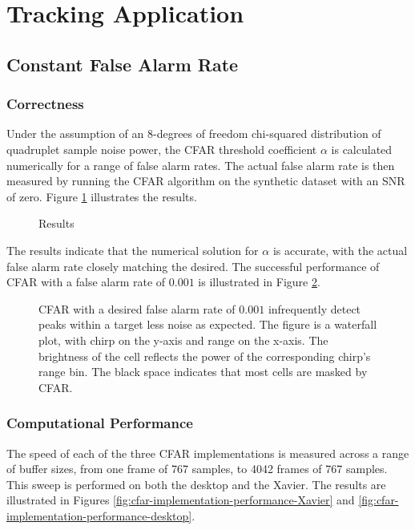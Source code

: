 \section{Tracking Application}

\subsection{Constant False Alarm Rate}
\subsubsection{Correctness}
Under the assumption of an 8-degrees of freedom chi-squared distribution of quadruplet sample noise power, the CFAR threshold coefficient $\alpha$ is calculated numerically for a range of false alarm rates. The actual false alarm rate is then measured by running the CFAR algorithm on the synthetic dataset with an SNR of zero. Figure \ref{fig:alpha-cfar-results} illustrates the results.

\begin{figure}[htbp]
    \centering
    \caption{Results }
    \label{fig:alpha-cfar-results}
\end{figure}

The results indicate that the numerical solution for $\alpha$ is accurate, with the actual false alarm rate closely matching the desired. The successful performance of CFAR with a false alarm rate of \(0.001\) is illustrated in Figure \ref{fig:cfar-0.001-waterfall}.

\begin{figure}[htbp]
    \centering
    \label{fig:cfar-0.001-waterfall}
    \caption{CFAR with a desired false alarm rate of \(0.001\) infrequently detect peaks within a target less noise as expected. The figure is a waterfall plot, with chirp on the y-axis and range on the x-axis. The brightness of the cell reflects the power of the corresponding chirp's range bin. The black space indicates that most cells are masked by CFAR.} 
\end{figure}

\subsubsection{Computational Performance}
The speed of each of the three CFAR implementations is measured across a range of buffer sizes, from one frame of 767 samples, to 4042 frames of 767 samples. This sweep is performed on both the desktop and the Xavier. The results are illustrated in Figures \ref{fig:cfar-implementation-performance-Xavier} and \ref{fig:cfar-implementation-performance-desktop}.

